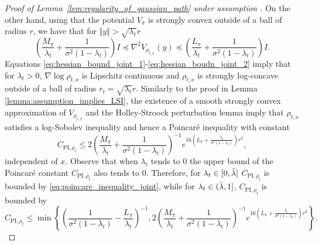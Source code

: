 \begin{proof}[Proof of Lemma~\ref{lem:regularity_of_gaussian_path} under assumption ]
On the other hand, using that the potential $V_\pi$ is strongly convex outside of a ball of radius $r$, we have that for $\Vert y\Vert >\sqrt{\lambda_t} r$
\begin{equation}\label{eq:hessian_boudn_joint_2}
   \left( \frac{M_{\pi}}{\lambda_t} + \frac{1}{\sigma^2(1-\lambda_t)} \right) I \preccurlyeq \nabla^2 V_{\rho_{t, x}} (y) \preccurlyeq \left(\frac{L_\pi}{\lambda_t} + \frac{1}{\sigma^2(1-\lambda_t)}\right) I. 
\end{equation}
Equations \eqref{eq:hessian_bound_joint_1}-\eqref{eq:hessian_boudn_joint_2} imply that for $\lambda_t>0$, $\nabla\log \rho_{t, x}$ is Lipschitz continuous and $\rho_{t, x}$ is strongly log-concave outside of a ball of radius $r_t = \sqrt{\lambda_t} r$. 
Similarly to the proof in Lemma \ref{lemma:assumption_implies_LSI}, the existence of a smooth strongly convex approximation of $V_{\rho_{t, x}}$ and the Holley-Stroock perturbation lemma \citep{RefWorks:RefID:85-holley1987logarithmic} imply that $\rho_{t, x}$ satisfies a log-Sobolev inequality and hence a Poincaré inequality with constant
\begin{equation}\label{eq:poincare_inequality_joint}
    C_{\text{PI}, \rho_t} \leq 2\left(\frac{M_{\pi}}{\lambda_t}+ \frac{1}{\sigma^2(1-\lambda_t)} \right)^{-1} e^{16 \left(L_\pi + \frac{\lambda_t}{\sigma^2(1-\lambda_t)}\right) r^2},
\end{equation}
independent of $x$. Observe that when $\lambda_t$ tends to $0$ the upper bound of the Poincaré constant $C_{\text{PI}, \rho_t}$ also tends to $0$. Therefore, for $\lambda_t\in[0, \Tilde{\lambda}]$ $C_{\text{PI}, \rho_t}$ is bounded by \eqref{eq:poincare_inequality_joint}, while for $\lambda_t\in(\Tilde{\lambda}, 1]$, $C_{\text{PI}, \rho_t}$ is bounded by 
\begin{equation*}
    C_{\text{PI}, \rho_t} \leq \min\left\{\left(\frac{1}{\sigma^2(1-\lambda_t)}-\frac{L_\pi}{\lambda_t}\right)^{-1}, 2\left(\frac{M_{\pi}}{\lambda_t}+ \frac{1}{\sigma^2(1-\lambda_t)} \right)^{-1} e^{16 \left(L_\pi + \frac{\lambda_t}{\sigma^2(1-\lambda_t)}\right) r^2}\right\}.
\end{equation*}
\end{proof}